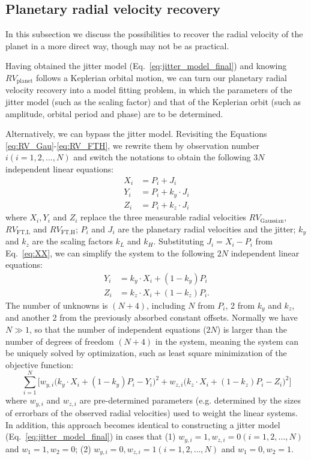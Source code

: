 \subsection{Planetary radial velocity recovery}

In this subsection we discuss the possibilities to recover the radial velocity of the planet in a more direct way, though may not be as practical.

Having obtained the jitter model (Eq.~\ref{eq:jitter_model_final}) and knowing $RV_\text{planet}$ follows a Keplerian orbital motion, we can turn our planetary radial velocity recovery into a model fitting problem, in which the parameters of the jitter model (such as the scaling factor) and that of the Keplerian orbit (such as amplitude, orbital period and phase) are to be determined. 

Alternatively, we can bypass the jitter model. Revisiting the Equations \ref{eq:RV_Gau}-\ref{eq:RV_FTH}, we rewrite them by observation number $i (i=1,2,\ldots,N)$ and switch the notations to obtain the following $3N$ independent linear equations:
\begin{align}
	X_i 		&= P_i + J_i				\label{eq:XX} \\
	Y_i 		&= P_i + k_y \cdot J_i	\label{eq:YY} \\
	Z_i 		&= P_i + k_z \cdot J_i 	\label{eq:ZZ}
\end{align}
where $X_i, Y_i$ and $Z_i$ replace the three measurable radial velocities $RV_\text{Gaussian}$, $RV_\text{FT,L}$ and $RV_\text{FT,H}$; $P_i$ and $J_i$ are the planetary radial velocities and the jitter; $k_y$ and $k_z$ are the scaling factors $k_L$ and $k_H$. Substituting $J_i = X_i - P_i$ from Eq.~\ref{eq:XX}, we can simplify the system to the following $2N$ independent linear equations:
\begin{align}
	Y_i 		&= k_y \cdot X_i + (1-k_y)P_i	\label{eq:YYY} \\
	Z_i 		&= k_z \cdot X_i + (1-k_z)P_i	\label{eq:ZZZ}.
\end{align}
The number of unknowns is $(N+4)$, including $N$ from $P_i$, 2 from $k_y$ and $k_z$, and another 2 from the previously absorbed constant offsets. Normally we have $N \gg 1$, so that the number of independent equations ($2N$) is larger than the number of degrees of freedom $(N+4)$ in the system, meaning the system can be uniquely solved by optimization, such as least square minimization of the objective function:
\begin{equation}
	\sum_{i=1}^{N} \Bigg[w_{y,i}\Big(k_y \cdot X_i + (1-k_y)P_i - Y_i \Big)^2 + w_{z,i}\Big(k_z \cdot X_i + (1-k_z)P_i- Z_i \Big)^2 \Bigg]
\label{eq:objective_function}
\end{equation}
where $w_{y,i}$ and $w_{z,i}$ are pre-determined parameters (e.g. determined by the sizes of errorbars of the observed radial velocities) used to weight the linear systems. In addition, this approach becomes identical to constructing a jitter model (Eq.~\ref{eq:jitter_model_final}) in cases that (1) $w_{y,i}=1, w_{z,i}=0 (i=1,2,\ldots,N)$ and $w_1=1, w_2=0$; (2) $w_{y,i}=0, w_{z,i}=1 (i=1,2,\ldots,N)$ and $w_1=0, w_2=1$. 

